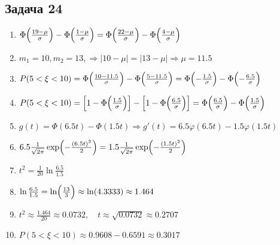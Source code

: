 \documentclass[a4paper,12pt]{article}
\begin{document}
\subsection{Задача 24}
\begin{enumerate}
    \item $\Phi\Bigl(\frac{19-\mu}{\sigma}\Bigr)-\Phi\Bigl(\frac{1-\mu}{\sigma}\Bigr) = \Phi\Bigl(\frac{22-\mu}{\sigma}\Bigr)-\Phi\Bigl(\frac{4-\mu}{\sigma}\Bigr)$
    \item $m_1 = 10, m_2 = 13, \Rightarrow |10-\mu|=|13-\mu| \Rightarrow \mu = 11.5$
    \item $P(5<\xi<10)=\Phi\Bigl(\frac{10-11.5}{\sigma}\Bigr)-\Phi\Bigl(\frac{5-11.5}{\sigma}\Bigr)=\Phi\Bigl(-\frac{1.5}{\sigma}\Bigr)-\Phi\Bigl(-\frac{6.5}{\sigma}\Bigr)$
    \item $P(5<\xi<10)=\Bigl[1-\Phi\Bigl(\frac{1.5}{\sigma}\Bigr)\Bigr]-\Bigl[1-\Phi\Bigl(\frac{6.5}{\sigma}\Bigr)\Bigr]=\Phi\Bigl(\frac{6.5}{\sigma}\Bigr)-\Phi\Bigl(\frac{1.5}{\sigma}\Bigr)$
    \item $g(t)=\Phi(6.5t)-\Phi(1.5t) \Rightarrow g'(t)=6.5\varphi(6.5t)-1.5\varphi(1.5t)$
    \item $6.5\frac{1}{\sqrt{2\pi}}\exp\Bigl(-\frac{(6.5t)^2}{2}\Bigr)=1.5\frac{1}{\sqrt{2\pi}}\exp\Bigl(-\frac{(1.5t)^2}{2}\Bigr)$
    \item $t^2=\frac{1}{20}\ln\frac{6.5}{1.5}$
    \item $\ln\frac{6.5}{1.5}=\ln\Bigl(\frac{13}{3}\Bigr)\approx \ln(4.3333)\approx 1.464$
    \item $t^2\approx \frac{1.464}{20}\approx 0.0732,\quad t\approx \sqrt{0.0732}\approx 0.2707$
    \item $P(5<\xi<10)\approx 0.9608-0.6591\approx 0.3017$
\end{enumerate}
\end{document}
